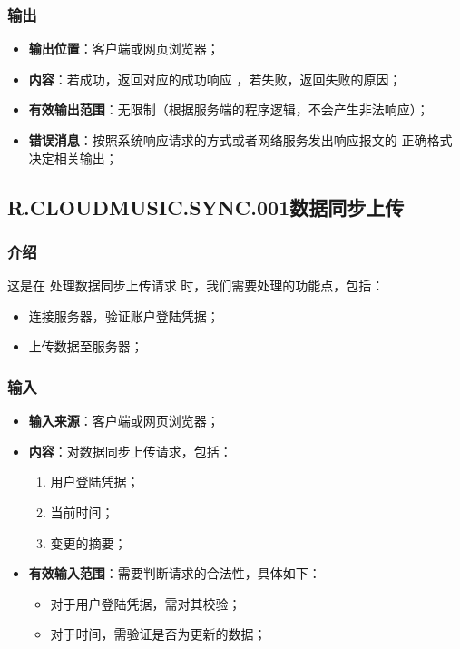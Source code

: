 \subsubsection{输出}
\begin{itemize}
	\item \textbf{输出位置}：客户端或网页浏览器；
	\item \textbf{内容}：若成功，返回对应的成功响应 ，若失败，返回失败的原因；
	\item \textbf{有效输出范围}：无限制（根据服务端的程序逻辑，不会产生非法响应）；
	\item \textbf{错误消息}：按照系统响应请求的方式或者网络服务发出响应报文的
		正确格式决定相关输出；
\end{itemize}

\subsection{R.CLOUDMUSIC.SYNC.001数据同步上传}
\subsubsection{介绍}
	这是在 处理数据同步上传请求 时，我们需要处理的功能点，包括：
	\begin{itemize}
		\item 连接服务器，验证账户登陆凭据；
		\item 上传数据至服务器；
	\end{itemize}
\subsubsection{输入}
	\begin{itemize}
		\item \textbf{输入来源}：客户端或网页浏览器；
		\item \textbf{内容}：对数据同步上传请求，包括：
		\begin{enumerate}
			\item 用户登陆凭据；
			\item 当前时间；
			\item 变更的摘要；
		\end{enumerate}
		\item \textbf{有效输入范围}：需要判断请求的合法性，具体如下：
		\begin{itemize}
			\item 对于用户登陆凭据，需对其校验； 
			\item 对于时间，需验证是否为更新的数据； 
		\end{itemize}
	\end{itemize}
